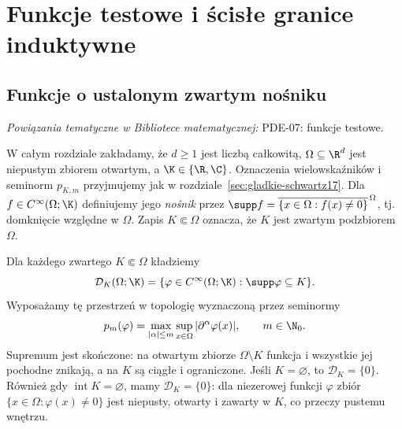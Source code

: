 
\section{Funkcje testowe i ścisłe granice induktywne}
\label{sec:funkcje-testowe18}

\providecommand{\atlasref}[2]{#2}


\subsection{Funkcje o ustalonym zwartym nośniku}

\noindent\emph{Powiązania tematyczne w Bibliotece matematycznej:} \atlasref{PDE-07::def:pde7-test}{PDE-07: funkcje testowe}.


W całym rozdziale zakładamy, że $d\ge1$ jest liczbą całkowitą,
$\Omega\subseteq\R^d$ jest niepustym zbiorem otwartym,
a $\K\in\{\R,\C\}$. Oznaczenia wielowskaźników i seminorm
$p_{K,m}$ przyjmujemy jak w rozdziale~\ref{sec:gladkie-schwartz17}.
Dla $f\in C^\infty(\Omega;\K)$ definiujemy jego \emph{nośnik}
przez $\supp f=\overline{\{x\in\Omega:f(x)\ne0\}}^{\,\Omega}$,
tj. domknięcie względne w $\Omega$. Zapis $K\Subset\Omega$
oznacza, że $K$ jest zwartym podzbiorem $\Omega$.

\begin{definicja}
\label{def:DK18}
Dla każdego zwartego $K\Subset\Omega$ kładziemy
\[
 \mathcal D_K(\Omega;\K)=\{\varphi\in C^\infty(\Omega;\K):
 \supp\varphi\subseteq K\}.
\]
Wyposażamy tę przestrzeń w topologię wyznaczoną przez seminormy
\[p_m(\varphi)=\max_{|\alpha|\le m}\sup_{x\in\Omega}
|\partial^\alpha\varphi(x)|,\qquad m\in\N_0.\]
Supremum jest skończone: na otwartym zbiorze $\Omega\setminus K$
funkcja i wszystkie jej pochodne znikają, a na $K$ są ciągłe
i ograniczone. Jeśli $K=\varnothing$, to $\mathcal D_K=\{0\}$.
Również gdy $\operatorname{int}K=\varnothing$, mamy
$\mathcal D_K=\{0\}$: dla niezerowej funkcji $\varphi$
zbiór $\{x\in\Omega:\varphi(x)\ne0\}$ jest niepusty,
otwarty i zawarty w $K$, co przeczy pustemu wnętrzu.
\end{definicja}

